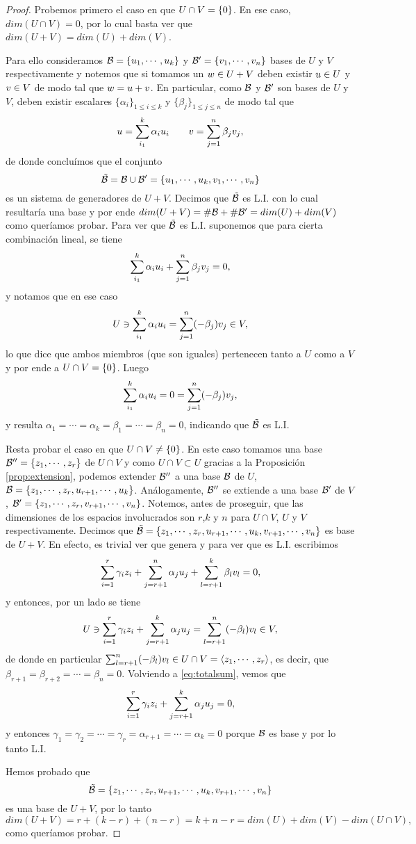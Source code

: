 \begin{proof}
Probemos primero el caso en que $U\cap V=\{\cero\}$. En ese caso, $dim(U\cap V)=0$, por lo cual basta ver que $dim(U+ V)=dim(U)+dim(V)$.

Para ello consideramos $\B=\{\ub_1,\cdots,\ub_k\}$ y $\B'=\{\vb_1,\cdots,\vb_n\}$ bases de $U$ y $V$ respectivamente y notemos que si tomamos un $\wb \in U+V$ deben existir $\ub \in U$ y $\vb\in V$ de modo tal que $\wb=\ub+\vb$. En particular, como $\mathcal B$ y $\mathcal B'$ son bases de $U$ y $V$,  deben existir escalares $\{\alpha_i\}_{1\le i\le k}$ y $\{\beta_j\}_{1\le j\le n}$ de modo tal que
$$
\ub= \sum_{i_1}^k\alpha_i\ub_i \qquad \vb=\sum_{j=1}^n\beta_j\vb_j,
$$
de donde conclu\'imos que el conjunto
$$\tilde{\B}=\B\cup \B'=\{ \ub_1,\cdots,\ub_k, \vb_1,\cdots,\vb_n\}$$
es un sistema de generadores de $U+V$. Decimos que $\tilde{\mathcal B}$ es L.I. con lo cual resultaría una base y por ende $dim(U+V)=\# \mathcal B + \#\mathcal B'=dim(U)+dim(V)$ como queríamos probar. Para ver que $\tilde{\mathcal B}$ es L.I. suponemos que para cierta combinación lineal, se tiene
$$
\sum_{i_1}^k\alpha_i\ub_i + \sum_{j=1}^n\beta_j\vb_j=\cero,
$$
y notamos que en ese caso
$$
 U \ni \sum_{i_1}^k\alpha_i\ub_i = \sum_{j=1}^n(-\beta_j)\vb_j \in V,
$$
lo que dice que ambos miembros (que son iguales) pertenecen tanto a $U$ como a $V$ y por ende a $U\cap V=\{\cero\}$. Luego
$$
\sum_{i_1}^k\alpha_i\ub_i = \cero= \sum_{j=1}^n(-\beta_j)\vb_j,
$$
y resulta $\alpha_1=\cdots=\alpha_k=\beta_1=\cdots=\beta_n=0$, indicando que $\tilde{\mathcal B}$ es L.I.

Resta probar el caso en que $U\cap V\neq \{\cero\}$. En este caso tomamos una base
$\B''=\{\zb_1,\cdots,\zb_r\}$ de $U\cap V$ y como $U\cap V\subset U$ gracias a la Proposición \ref{prop:extension}, podemos extender $\mathcal B''$ a una base $\mathcal B$ de $U$,
$\B=\{\zb_1,\cdots,\zb_r, \ub_{r+1},\cdots, \ub_k \}$.  Análogamente, $\mathcal B''$ se extiende a una base $\mathcal B'$ de $V$, $\B'=\{\zb_1,\cdots,\zb_r, \vb_{r+1},\cdots, \vb_n\}$.  Notemos, antes de proseguir, que las dimensiones de los espacios involucrados son $r$,$k$ y $n$ para  $U\cap V$, $U$ y $V$ respectivamente. Decimos que
 $\tilde{\B}=\{\zb_1,\cdots,\zb_r,\ub_{r+1},\cdots, \ub_k, \vb_{r+1},\cdots, \vb_n\}$ es base de $U+V$. En efecto, es trivial ver que genera y para ver que es L.I. escribimos
 $$
 \sum_{i=1}^r\gamma_i \zb_i +\sum_{j=r+1}^{n}\alpha_j \ub_j +\sum_{l=r+1}^{k}\beta_l \vb_l = \cero,
 $$
 y entonces, por un lado se tiene
 \begin{equation}
 \label{eq:totalsum}
U \ni  \sum_{i=1}^r\gamma_i \zb_i +\sum_{j=r+1}^{k}\alpha_j \ub_j =\sum_{l=r+1}^{n}(-\beta_l) \vb_l \in V,
 \end{equation}
 de donde en particular
 $\sum_{l=r+1}^{n}(-\beta_l) \vb_l \in U\cap V = \langle \zb_1,\cdots,\zb_r \rangle$, es decir, que $\beta_{r+1}=\beta_{r+2}=\cdots = \beta_n=0$.  Volviendo a \eqref{eq:totalsum}, vemos
 que
  $$
  \sum_{i=1}^r\gamma_i \zb_i +\sum_{j=r+1}^{k}\alpha_j \ub_j=\cero,
  $$
  y entonces
  $\gamma_1=\gamma_2=\cdots=\gamma_r=\alpha_{r+1}=\cdots=\alpha_{k}=0$ porque
  $\mathcal B$ es base y por lo tanto L.I.

  Hemos probado que
  $$\tilde{\B}=\{\zb_1,\cdots,\zb_r,\ub_{r+1},\cdots, \ub_k, \vb_{r+1},\cdots, \vb_n\}$$
  es una base de $U+V$, por lo tanto
  $$dim(U+V)=r+(k-r)+(n-r)=k+n-r=dim(U)+dim(V)-dim(U\cap V),$$
  como queríamos probar. \end{proof} 